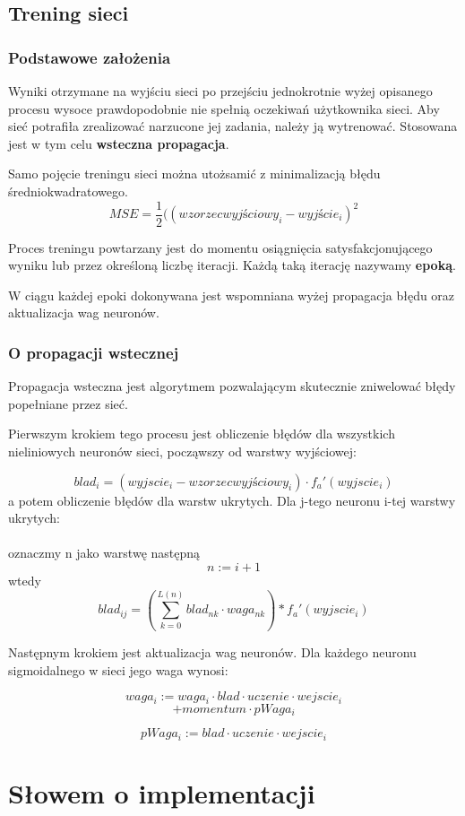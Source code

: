 \documentclass{classrep}
\begin{document}
\subsection{Trening sieci}
\subsubsection{Podstawowe założenia}
Wyniki otrzymane na wyjściu sieci po przejściu jednokrotnie wyżej opisanego procesu wysoce prawdopodobnie nie spełnią oczekiwań użytkownika sieci. Aby sieć potrafiła zrealizować narzucone jej zadania, należy ją wytrenować. Stosowana jest w tym celu \textbf{wsteczna propagacja}.

Samo pojęcie treningu sieci można utożsamić z minimalizacją błędu średniokwadratowego.
$$ MSE = \frac{1}{2}((wzorzecwyjściowy_i-wyjście_i)^2 $$

Proces treningu powtarzany jest do momentu osiągnięcia satysfakcjonującego wyniku lub przez określoną liczbę iteracji. Każdą taką iterację nazywamy \textbf{epoką}.

W ciągu każdej epoki dokonywana jest wspomniana wyżej propagacja błędu oraz aktualizacja wag neuronów.
\clearpage
\subsubsection{O propagacji wstecznej}

Propagacja wsteczna jest algorytmem pozwalającym skutecznie zniwelować błędy popełniane przez sieć.

Pierwszym krokiem tego procesu jest obliczenie błędów dla wszystkich nieliniowych neuronów sieci, począwszy od warstwy wyjściowej:

$$ blad_i = (wyjscie_i - wzorzecwyjściowy_i) \cdot  f_a'(wyjscie_i) $$
a potem obliczenie błędów dla warstw ukrytych. Dla j-tego neuronu i-tej warstwy ukrytych:
\\~\\
oznaczmy n jako warstwę następną
$$ n := i + 1 $$
wtedy
$$blad_{ij} = (\sum_{k=0}^{L(n)} blad_{nk} \cdot waga_{nk}) * f_a'(wyjscie_i) $$

Następnym krokiem jest aktualizacja wag neuronów. Dla każdego neuronu sigmoidalnego w sieci jego waga wynosi:

$$waga_i := waga_i \cdot blad \cdot uczenie \cdot wejscie_i$$
$$+ momentum \cdot pWaga_i$$

$$pWaga_i := blad \cdot uczenie \cdot wejscie_i $$


\section{Słowem o implementacji}
\end{document}
